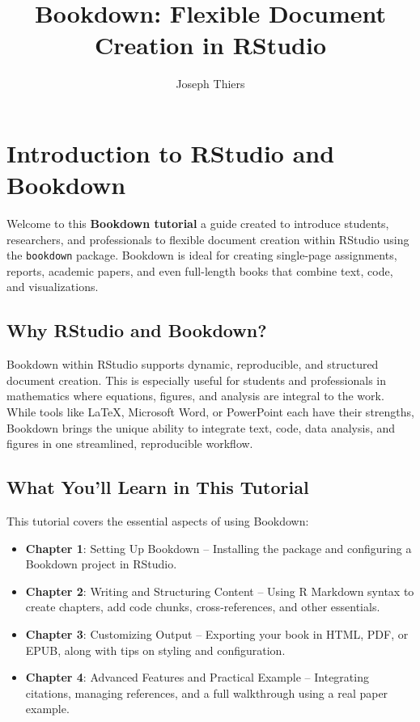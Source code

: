 \documentclass[
]{book}
\title{Bookdown: Flexible Document Creation in RStudio}
\author{Joseph Thiers}
\date{}
\theoremstyle{definition}
\theoremstyle{definition}
\theoremstyle{definition}
\theoremstyle{definition}
\theoremstyle{remark}
\begin{document}
\maketitle

{
\setcounter{tocdepth}{1}
\tableofcontents
}
\chapter{Introduction to RStudio and Bookdown}\label{introduction-to-rstudio-and-bookdown}

Welcome to this \textbf{Bookdown tutorial} a guide created to introduce students, researchers, and professionals to flexible document creation within RStudio using the \texttt{bookdown} package. Bookdown is ideal for creating single-page assignments, reports, academic papers, and even full-length books that combine text, code, and visualizations.

\section{Why RStudio and Bookdown?}\label{why-rstudio-and-bookdown}

Bookdown within RStudio supports dynamic, reproducible, and structured document creation. This is especially useful for students and professionals in mathematics where equations, figures, and analysis are integral to the work. While tools like LaTeX, Microsoft Word, or PowerPoint each have their strengths, Bookdown brings the unique ability to integrate text, code, data analysis, and figures in one streamlined, reproducible workflow.

\section{What You'll Learn in This Tutorial}\label{what-youll-learn-in-this-tutorial}

This tutorial covers the essential aspects of using Bookdown:

\begin{itemize}
\item
  \textbf{Chapter 1}: Setting Up Bookdown -- Installing the package and configuring a Bookdown project in RStudio.
\item
  \textbf{Chapter 2}: Writing and Structuring Content -- Using R Markdown syntax to create chapters, add code chunks, cross-references, and other essentials.
\item
  \textbf{Chapter 3}: Customizing Output -- Exporting your book in HTML, PDF, or EPUB, along with tips on styling and configuration.
\item
  \textbf{Chapter 4}: Advanced Features and Practical Example -- Integrating citations, managing references, and a full walkthrough using a real paper example.
\end{itemize}
\end{document}
